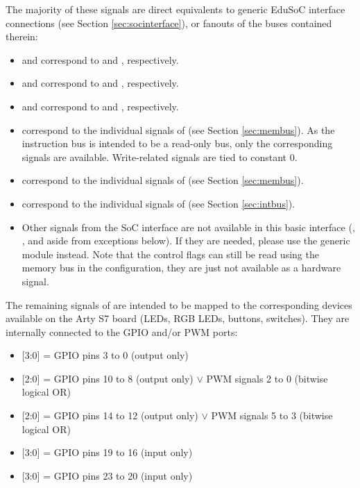 The majority of these signals are direct equivalents to generic EduSoC interface connections (see Section \ref{sec:socinterface}), or fanouts of the buses contained therein:
\begin{itemize}
    \item {} and  correspond to  and , respectively.
    \item {} and  correspond to  and , respectively.
    \item {} and  correspond to  and , respectively.
    \item {} correspond to the individual signals of  (see Section \ref{sec:membus}). As the instruction bus is intended to be a read-only bus, only the corresponding signals are available. Write-related signals are tied to constant 0.
    \item {} correspond to the individual signals of  (see Section \ref{sec:membus}).
    \item {} correspond to the individual signals of  (see Section \ref{sec:intbus}).
    \item Other signals from the SoC interface are not available in this basic interface (, ,  and  aside from exceptions below). If they are needed, please use the generic  module instead. Note that the control flags can still be read using the memory bus in the  configuration, they are just not available as a hardware signal.
\end{itemize}
\newpage
The remaining signals of  are intended to be mapped to the corresponding devices available on the Arty S7 board (LEDs, RGB LEDs, buttons, switches). They are internally connected to the GPIO and/or PWM ports:
\begin{itemize}
    \item {}[3:0] = GPIO pins 3 to 0 (output only)
    \item {}[2:0] = GPIO pins 10 to 8 (output only) $\vee$ PWM signals 2 to 0 (bitwise logical OR)
    \item {}[2:0] = GPIO pins 14 to 12 (output only) $\vee$ PWM signals 5 to 3 (bitwise logical OR)
    \item {}[3:0] = GPIO pins 19 to 16 (input only)
    \item {}[3:0] = GPIO pins 23 to 20 (input only)
\end{itemize}

